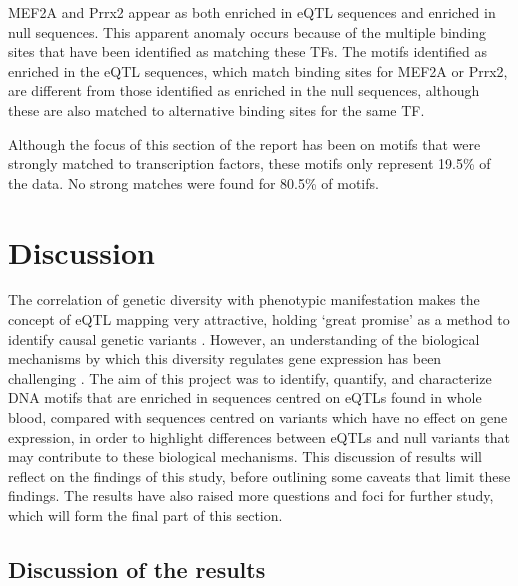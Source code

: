 \documentclass[12pt]{article}
\begin{document}
MEF2A and Prrx2 appear as both enriched in eQTL sequences and enriched in null sequences. This apparent anomaly occurs because of the multiple binding sites that have been identified as matching these TFs. The motifs identified as enriched in the eQTL sequences, which match binding sites for MEF2A or Prrx2, are different from those identified as enriched in the null sequences, although these are also matched to alternative binding sites for the same TF. 



Although the focus of this section of the report has been on motifs that were strongly matched to transcription factors, these motifs only represent 19.5\% of the data. No strong matches were found for 80.5\% of motifs. 



\newpage
\section{Discussion}

The correlation of genetic diversity with phenotypic manifestation makes the concept of eQTL mapping very attractive, holding `great promise' as a method to identify causal genetic variants \citep{Pai2015}. However, an understanding of the biological mechanisms by which this diversity regulates gene expression has been challenging \citep{Pai2015, gaffney2013global} . The aim of this project was to identify, quantify, and characterize DNA motifs that are enriched in sequences centred on eQTLs found in whole blood, compared with sequences centred on variants which have no effect on gene expression, in order to highlight differences between eQTLs and null variants that may contribute to these biological mechanisms. This discussion of results will reflect on the findings of this study, before outlining some caveats that limit these findings. The results have also raised more questions and foci for further study, which will form the final part of this section.

\subsection{Discussion of the results}
\end{document}
